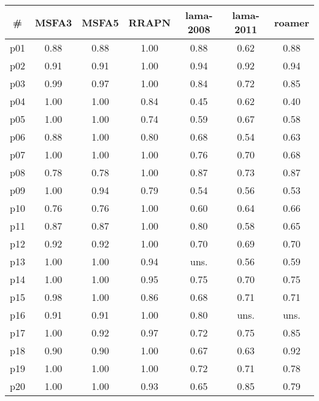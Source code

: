 \begin{tabular}{ccccccc}
\toprule
\textbf{\#} & \textbf{MSFA3} & \textbf{MSFA5} & \textbf{RRAPN} & \textbf{lama-2008} & \textbf{lama-2011} & \textbf{roamer}\\
\midrule
p01 & 0.88 & 0.88 & 1.00 & 0.88 & 0.62 & 0.88\\
p02 & 0.91 & 0.91 & 1.00 & 0.94 & 0.92 & 0.94\\
p03 & 0.99 & 0.97 & 1.00 & 0.84 & 0.72 & 0.85\\
p04 & 1.00 & 1.00 & 0.84 & 0.45 & 0.62 & 0.40\\
p05 & 1.00 & 1.00 & 0.74 & 0.59 & 0.67 & 0.58\\
p06 & 0.88 & 1.00 & 0.80 & 0.68 & 0.54 & 0.63\\
p07 & 1.00 & 1.00 & 1.00 & 0.76 & 0.70 & 0.68\\
p08 & 0.78 & 0.78 & 1.00 & 0.87 & 0.73 & 0.87\\
p09 & 1.00 & 0.94 & 0.79 & 0.54 & 0.56 & 0.53\\
p10 & 0.76 & 0.76 & 1.00 & 0.60 & 0.64 & 0.66\\
p11 & 0.87 & 0.87 & 1.00 & 0.80 & 0.58 & 0.65\\
p12 & 0.92 & 0.92 & 1.00 & 0.70 & 0.69 & 0.70\\
p13 & 1.00 & 1.00 & 0.94 & uns. & 0.56 & 0.59\\
p14 & 1.00 & 1.00 & 0.95 & 0.75 & 0.70 & 0.75\\
p15 & 0.98 & 1.00 & 0.86 & 0.68 & 0.71 & 0.71\\
p16 & 0.91 & 0.91 & 1.00 & 0.80 & uns. & uns.\\
p17 & 1.00 & 0.92 & 0.97 & 0.72 & 0.75 & 0.85\\
p18 & 0.90 & 0.90 & 1.00 & 0.67 & 0.63 & 0.92\\
p19 & 1.00 & 1.00 & 1.00 & 0.72 & 0.71 & 0.78\\
p20 & 1.00 & 1.00 & 0.93 & 0.65 & 0.85 & 0.79\\
\bottomrule
\end{tabular}


